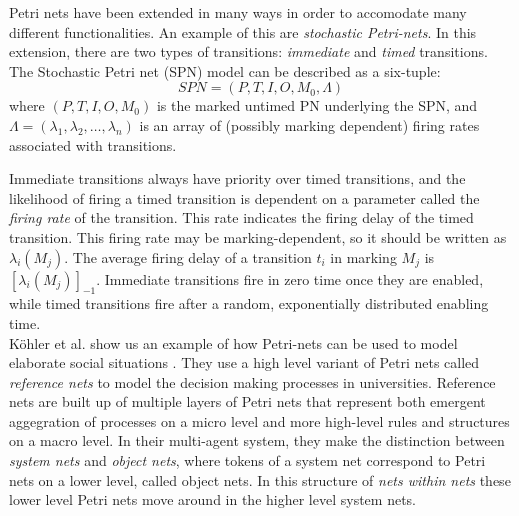 \documentclass[11pt, a4paper]{book}
\begin{document}
Petri nets have been extended in many ways in order to accomodate many different functionalities. An example of this are \emph{stochastic Petri-nets}. In this extension, there are two types of transitions: \emph{immediate} and \emph{timed} transitions.
The Stochastic Petri net (SPN) model can be described as a six-tuple:
\begin{equation}
SPN = (P,T,I,O,M_0,\Lambda)
\end{equation}
where $(P,T,I,O,M_0)$ is the marked untimed PN underlying the SPN, and $\Lambda = (\lambda_1, \lambda_2, \ldots, \lambda_n)$ is an array of (possibly marking dependent) firing rates associated with transitions.

Immediate transitions always have priority over timed transitions, and  the likelihood of firing a timed transition is dependent on a parameter called the \emph{firing rate} of the transition. This rate indicates the firing delay of the timed transition. This firing rate may be marking-dependent, so it should be written as $\lambda_i(M_j)$.  The average firing delay of a transition $t_i$ in marking $M_j$ is $[\lambda_i(M_j)]_{-1}$. Immediate transitions fire in zero time once they are enabled, while timed transitions fire after a random, exponentially distributed enabling time.\\
K\"{o}hler et al. show us an example of how Petri-nets can be used to model elaborate social situations \cite{Köhler03modellingsocial}. They use a high level variant of Petri nets called \emph{reference nets} to model the decision making processes in universities. Reference nets are built up of multiple layers of Petri nets that represent both emergent aggegration of processes on a micro level and more high-level rules and structures on a macro level. In their multi-agent system, they make the distinction between \emph{system nets} and \emph{object nets}, where tokens of a system net correspond to Petri nets on a lower level, called object nets. In this structure of \emph{nets within nets} these lower level Petri nets move around in the higher level system nets. 

\end{document}
